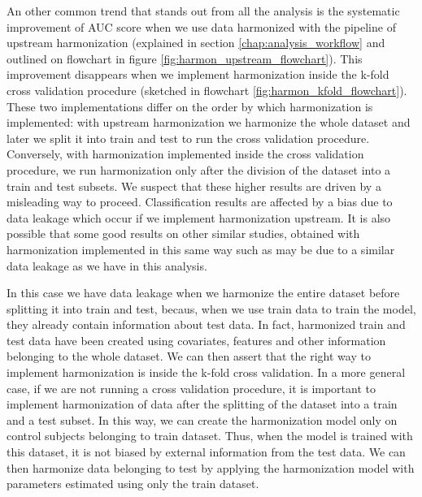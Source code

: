 \documentclass[11pt]{report}
\begin{document}
\noindent An other common trend that stands out from all the analysis is the systematic improvement of AUC score when we use data harmonized with the pipeline of upstream harmonization (explained in section \ref{chap:analysis_workflow} and outlined on flowchart in figure \ref{fig:harmon_upstream_flowchart}).
This improvement disappears when we implement harmonization inside the k-fold cross validation procedure (sketched in flowchart \ref{fig:harmon_kfold_flowchart}).
These two implementations differ on the order by which harmonization is implemented: with upstream harmonization we harmonize the whole dataset and later we split it into train and test to run the cross validation procedure.
Conversely, with harmonization implemented inside the cross validation procedure, we run harmonization only after the division of the dataset into a train and test subsets.
We suspect that these higher results are driven by a misleading way to proceed.
Classification results are affected by a bias due to data leakage which occur if we implement harmonization upstream.
It is also possible that some good results on other similar studies, obtained with harmonization implemented in this same way such as \cite{ingalhalikar-2021} may be due to a similar data leakage as we have in this analysis.



In this case we have data leakage when we harmonize the entire dataset before splitting it into train and test, becaus, when we use train data to train the model, they already contain information about test data.
In fact, harmonized train and test data have been created using covariates, features and other information belonging to the whole dataset.
We can then assert that the right way to implement harmonization is inside the k-fold cross validation. 
In a more general case, if we are not running a cross validation procedure, it is important to implement harmonization of data after the splitting of the dataset into a train and a test subset.
In this way, we can create the harmonization model only on control subjects belonging to train dataset.
Thus, when the model is trained with this dataset, it is not biased by external information from the test data.
We can then harmonize data belonging to test by applying the harmonization model with parameters estimated using only the train dataset.

\end{document}
